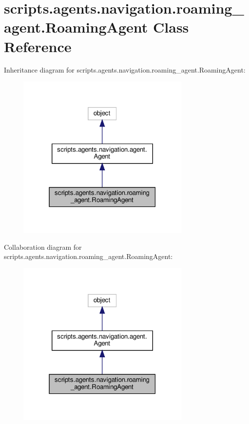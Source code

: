 \hypertarget{classscripts_1_1agents_1_1navigation_1_1roaming__agent_1_1RoamingAgent}{}\section{scripts.\+agents.\+navigation.\+roaming\+\_\+agent.\+Roaming\+Agent Class Reference}
\label{classscripts_1_1agents_1_1navigation_1_1roaming__agent_1_1RoamingAgent}


Inheritance diagram for scripts.\+agents.\+navigation.\+roaming\+\_\+agent.\+Roaming\+Agent\+:
\nopagebreak
\begin{figure}[H]
\begin{center}
\leavevmode
\includegraphics[width=243pt]{d2/d14/classscripts_1_1agents_1_1navigation_1_1roaming__agent_1_1RoamingAgent__inherit__graph}
\end{center}
\end{figure}


Collaboration diagram for scripts.\+agents.\+navigation.\+roaming\+\_\+agent.\+Roaming\+Agent\+:
\nopagebreak
\begin{figure}[H]
\begin{center}
\leavevmode
\includegraphics[width=243pt]{d9/dc7/classscripts_1_1agents_1_1navigation_1_1roaming__agent_1_1RoamingAgent__coll__graph}
\end{center}
\end{figure}
